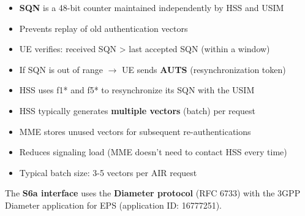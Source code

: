 
\begin{itemize}
\tightlist
\item
  \textbf{SQN} is a 48-bit counter maintained independently by HSS and USIM
\item
  Prevents replay of old authentication vectors
\item
  UE verifies: received SQN \textgreater{} last accepted SQN (within a window)
\item
  If SQN is out of range \ensuremath{\to} UE sends \textbf{AUTS} (resynchronization token)
\item
  HSS uses f1* and f5* to resynchronize its SQN with the USIM
\end{itemize}


\begin{itemize}
\tightlist
\item
  HSS typically generates \textbf{multiple vectors} (batch) per request
\item
  MME stores unused vectors for subsequent re-authentications
\item
  Reduces signaling load (MME doesn’t need to contact HSS every time)
\item
  Typical batch size: 3-5 vectors per AIR request
\end{itemize}



The \textbf{S6a interface} uses the \textbf{Diameter protocol} (RFC 6733) with the 3GPP Diameter application for EPS (application ID: 16777251).


